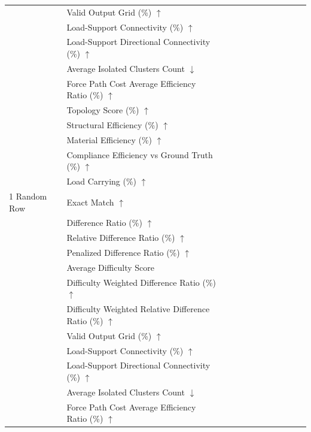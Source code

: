\begin{table}[!h]
{\begin{tabular}{llllllllllll}
 & Valid Output Grid (\%) $\uparrow$ &  &  &  &  &  &  &  &  &  &  \\
 & Load-Support Connectivity (\%) $\uparrow$ &  &  &  &  &  &  &  &  &  &  \\
 & Load-Support Directional Connectivity (\%) $\uparrow$ &  &  &  &  &  &  &  &  &  &  \\
 & Average Isolated Clusters Count $\downarrow$ &  &  &  &  &  &  &  &  &  &  \\
 & Force Path Cost Average Efficiency Ratio (\%) $\uparrow$ &  &  &  &  &  &  &  &  &  &  \\
 & Topology Score (\%) $\uparrow$ &  &  &  &  &  &  &  &  &  &  \\
 & Structural Efficiency (\%) $\uparrow$ &  &  &  &  &  &  &  &  &  &  \\
 & Material Efficiency (\%) $\uparrow$ &  &  &  &  &  &  &  &  &  &  \\
 & Compliance Efficiency vs Ground Truth (\%) $\uparrow$ &  &  &  &  &  &  &  &  &  &  \\
 & Load Carrying (\%) $\uparrow$ &  &  &  &  &  &  &  &  &  &  \\
1 Random Row & Exact Match $\uparrow$ &  &  &  &  &  &  &  &  &  &  \\
 & Difference Ratio (\%) $\uparrow$ &  &  &  &  &  &  &  &  &  &  \\
 & Relative Difference Ratio (\%) $\uparrow$ &  &  &  &  &  &  &  &  &  &  \\
 & Penalized Difference Ratio (\%) $\uparrow$ &  &  &  &  &  &  &  &  &  &  \\
 & Average Difficulty Score &  &  &  &  &  &  &  &  &  &  \\
 & Difficulty Weighted Difference Ratio (\%) $\uparrow$ &  &  &  &  &  &  &  &  &  &  \\
 & Difficulty Weighted Relative Difference Ratio (\%) $\uparrow$ &  &  &  &  &  &  &  &  &  &  \\
 & Valid Output Grid (\%) $\uparrow$ &  &  &  &  &  &  &  &  &  &  \\
 & Load-Support Connectivity (\%) $\uparrow$ &  &  &  &  &  &  &  &  &  &  \\
 & Load-Support Directional Connectivity (\%) $\uparrow$ &  &  &  &  &  &  &  &  &  &  \\
 & Average Isolated Clusters Count $\downarrow$ &  &  &  &  &  &  &  &  &  &  \\
 & Force Path Cost Average Efficiency Ratio (\%) $\uparrow$ &  &  &  &  &  &  &  &  &  &  \\

\end{tabular}}
\end{table}
